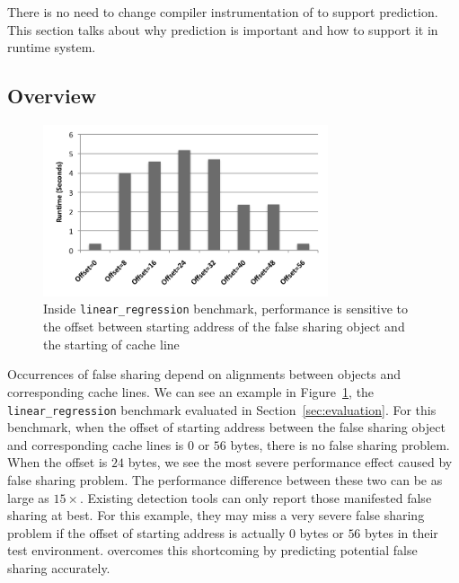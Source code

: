 \label{sec:prediction}
There is no need to change compiler instrumentation of \Predator{} to support prediction.
This section talks about why prediction is important and how to support it in runtime system.  

\subsection{Overview}
\label{sec:predictoverview}

\begin{figure}[!h]
\begin{center}
\includegraphics[width=3.3in]{fig/perfsensitive}
\end{center}
\caption{
Inside \texttt{linear\_regression} benchmark,
performance is sensitive to the offset between starting address of the false sharing object 
and the starting of cache line 
\label{fig:perfsensitive}}
\end{figure}

Occurrences of false sharing depend on 
alignments between objects and corresponding cache lines.
We can see an example in Figure~\ref{fig:perfsensitive}, the \texttt{linear\_regression} 
benchmark evaluated in Section~\ref{sec:evaluation}. 
For this benchmark,
when the offset of starting address between the false sharing object and corresponding cache lines 
is $0$ or $56$ bytes, 
there is no false sharing problem. 
When the offset is $24$ bytes, we see the most severe performance effect caused 
by false sharing problem. 
The performance difference between these two can be as large as $15\times$.
Existing detection tools can only report those manifested false sharing at best. 
For this example, they may miss a very severe false sharing problem if the offset of starting 
address is actually $0$ bytes or $56$ bytes in their test environment.
\Predator{} overcomes this shortcoming by predicting potential false sharing accurately. 

